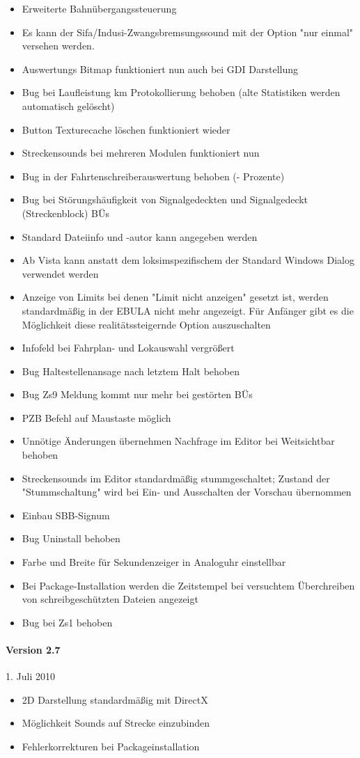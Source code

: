 \begin{itemize}
\itemsep1pt\parskip0pt
\item
  Erweiterte Bahnübergangssteuerung
\item
  Es kann der Sifa/Indusi-Zwangsbremsungssound mit der Option "nur
  einmal" versehen werden.
\item
  Auswertungs Bitmap funktioniert nun auch bei GDI Darstellung
\item
  Bug bei Laufleistung km Protokollierung behoben (alte Statistiken
  werden automatisch gelöscht)
\item
  Button Texturecache löschen funktioniert wieder
\item
  Streckensounds bei mehreren Modulen funktioniert nun
\item
  Bug in der Fahrtenschreiberauswertung behoben (- Prozente)
\item
  Bug bei Störungshäufigkeit von Signalgedeckten und Signalgedeckt
  (Streckenblock) BÜs
\item
  Standard Dateiinfo und -autor kann angegeben werden
\item
  Ab Vista kann anstatt dem loksimspezifischem der Standard Windows
  Dialog verwendet werden
\item
  Anzeige von Limits bei denen "Limit nicht anzeigen" gesetzt ist,
  werden standardmäßig in der EBULA nicht mehr angezeigt. Für Anfänger
  gibt es die Möglichkeit diese realitätssteigernde Option auszuschalten
\item
  Infofeld bei Fahrplan- und Lokauswahl vergrößert
\item
  Bug Haltestellenansage nach letztem Halt behoben
\item
  Bug Zs9 Meldung kommt nur mehr bei gestörten BÜs
\item
  PZB Befehl auf Maustaste möglich
\item
  Unnötige Änderungen übernehmen Nachfrage im Editor bei Weitsichtbar
  behoben
\item
  Streckensounds im Editor standardmäßig stummgeschaltet; Zustand der
  "Stummschaltung" wird bei Ein- und Ausschalten der Vorschau übernommen
\item
  Einbau SBB-Signum
\item
  Bug Uninstall behoben
\item
  Farbe und Breite für Sekundenzeiger in Analoguhr einstellbar
\item
  Bei Package-Installation werden die Zeitstempel bei versuchtem
  Überchreiben von schreibgeschützten Dateien angezeigt
\item
  Bug bei Zs1 behoben
\end{itemize}

\paragraph{Version 2.7}

1. Juli 2010

\begin{itemize}
\itemsep1pt\parskip0pt
\item
  2D Darstellung standardmäßig mit DirectX
\item
  Möglichkeit Sounds auf Strecke einzubinden
\item
  Fehlerkorrekturen bei Packageinstallation
\end{itemize}

